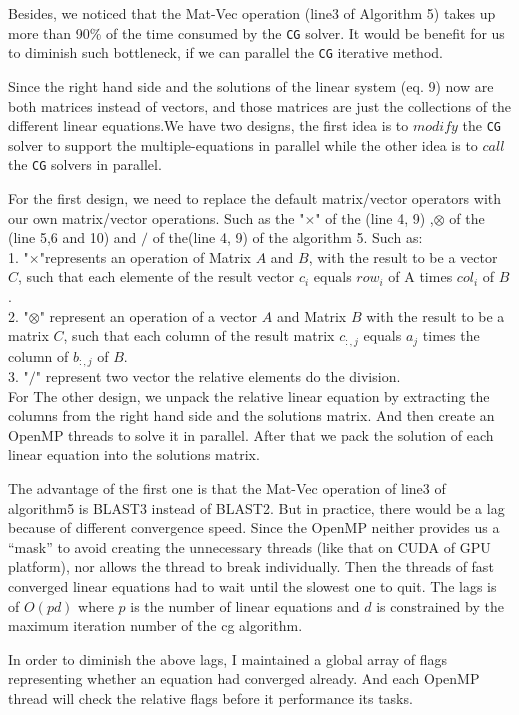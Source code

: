 Besides, we noticed that the Mat-Vec operation (line3 of Algorithm 5) takes up more than 90\% of the time consumed by the {\tt CG} solver. It would be benefit for us to diminish such bottleneck, if we can parallel the {\tt CG} iterative method.  

Since the right hand side and the solutions of the linear system (eq. 9) now are both matrices instead of vectors, and those matrices are just the collections of the different linear equations.We have two designs, the first idea is to $modify$ the {\tt CG} solver to support the multiple-equations in parallel while the other idea is to $call$ the {\tt CG} solvers in parallel.

For the first design, we need to replace the default matrix/vector operators with our own matrix/vector operations. Such as the "$\times$" of the (line 4, 9) ,$\otimes$ of the (line 5,6 and 10) and $/$ of the(line 4, 9) of the algorithm 5. Such as: \\
1. "$\times$"represents an operation of Matrix $A$ and $B$, with the result to be a vector $C$, such that each elemente of the result vector $c_i$ equals $row_i$ of A times $col_i$ of $B$. \\ 
2. "$\otimes$" represent an operation of a vector $A$ and Matrix $B$ with the result to be a matrix $C$, such that each column of the result matrix $c_{:,j}$ equals $a_j$ times the column of $b_{:,j}$ of $B$.\\
3. "$/$" represent two vector the relative elements do the  division.  \\
For The other design, we unpack the relative linear equation by extracting the columns from the right hand side and the solutions matrix. And then create an OpenMP threads to solve it in parallel. After that we pack the solution of each linear equation into the solutions matrix.

The advantage of the first one is that the Mat-Vec operation of line3 of algorithm5 is BLAST3 instead of BLAST2. But in practice, there would be a lag because of different convergence speed. Since the OpenMP neither provides us a “mask” to avoid creating the unnecessary threads (like that on CUDA of GPU platform), nor allows the thread to break individually. Then the threads of fast converged linear equations had to wait until the slowest one to quit. The lags is of $O(pd)$ where $p$ is the number of linear equations and $d$ is constrained by the maximum iteration number of the cg algorithm.

In order to diminish the above lags, I maintained a global array of flags representing whether an equation had converged already. And each OpenMP thread will check the relative flags before it performance its tasks.  

